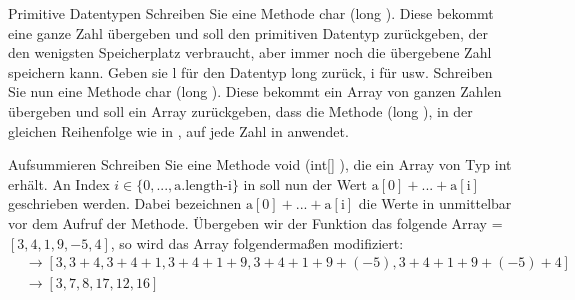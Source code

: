 \documentclass{../preamble}
\begin{document}
\clearpage

\begin{task}[credit = \stars{2}{3}]{Primitive Datentypen}
    Schreiben Sie eine Methode \textcolor{keywordcolor}{char} (\textcolor{keywordcolor}{long} ). Diese bekommt eine ganze Zahl übergeben und soll den primitiven Datentyp zurückgeben, der den wenigsten Speicherplatz verbraucht, aber immer noch die übergebene Zahl speichern kann. Geben sie \grq \textcolor{stringcolor}{l}\grq{} für den Datentyp \textcolor{keywordcolor}{long} zurück, \grq \textcolor{stringcolor}{i}\grq{} für  usw.
    \br
    Schreiben Sie nun eine Methode \textcolor{keywordcolor}{char}\code{[]} (\textcolor{keywordcolor}{long}\code{[]} ). Diese bekommt ein Array von ganzen Zahlen übergeben und soll ein Array zurückgeben, dass die Methode (\textcolor{keywordcolor}{long} ), in der gleichen Reihenfolge wie in , auf jede Zahl in  anwendet.

    \begin{solution}
        
    \end{solution}
\end{task}

\clearpage

\begin{task}[credit = \stars{2}{3}]{Aufsummieren}
    Schreiben Sie eine Methode \textcolor{keywordcolor}{void} (\textcolor{keywordcolor}{int}[] ), die ein Array  von Typ \textcolor{keywordcolor}{int} erhält.
    \br
    An Index \(i \in \{0, ..., \text{a.length-i}\}\) in  soll nun der Wert \(\text{a}[0] + ... + \text{a}[\text{i}]\) geschrieben werden. Dabei bezeichnen \(\text{a}[0] + ... + \text{a}[\text{i}]\) die Werte in  unmittelbar vor dem Aufruf der Methode.
    \br
    Übergeben wir der Funktion das folgende Array  = \([3, 4, 1, 9, -5, 4]\), so wird das Array folgendermaßen modifiziert:
    \begin{align*}
         & \rightarrow [3, 3 + 4, 3 + 4 + 1, 3 + 4 + 1 + 9, 3 + 4 + 1 + 9 + (-5), 3 + 4 + 1 + 9 + (-5) + 4]
        \\
         & \rightarrow [3, 7, 8, 17, 12, 16]
    \end{align*}

    \begin{solution}
        
    \end{solution}
\end{task}
\end{document}
